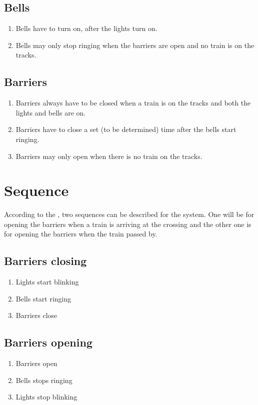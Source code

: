 \documentclass[final]{report}
\begin{document}
\subsection{Bells}
	\begin{enumerate}
		\item Bells have to turn on, after the lights turn on.
		\item Bells may only stop ringing when the barriers are open and no train is on the tracks.
	\end{enumerate}

\subsection{Barriers}
	\begin{enumerate}
		\item Barriers always have to be closed when a train is on the tracks and both the lights and bells are on.
		\item Barriers have to close a set (to be determined) time after the bells start ringing.
		\item Barriers may only open when there is no train on the tracks.
	\end{enumerate}


\section{Sequence}
According to the , two sequences can be described for the system.
One will be for opening the barriers when a train is arriving at the crossing and the other one is for opening the barriers when the train passed by.

\subsection{Barriers closing}
\begin{enumerate}
\item Lights start blinking
\item Bells start ringing
\item Barriers close
\end{enumerate}

\subsection{Barriers opening}
\begin{enumerate}
\item Barriers open
\item Bells stops ringing
\item Lights stop blinking
\end{enumerate}
\end{document}
